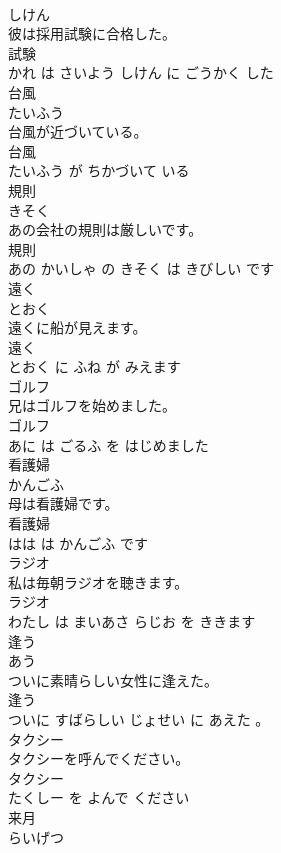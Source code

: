 \documentclass[8pt]{extreport}
\begin{document}
\begin{CJK}{UTF8}{min}
\\	しけん			
\\	彼は採用試験に合格した。	
\\	試験 
\\	かれ は さいよう しけん に ごうかく した			
\\	台風	
\\	たいふう			
\\	台風が近づいている。	
\\	台風 
\\	たいふう が ちかづいて いる			
\\	規則	
\\	きそく			
\\	あの会社の規則は厳しいです。	
\\	規則 
\\	あの かいしゃ の きそく は きびしい です			
\\	遠く	
\\	とおく			
\\	遠くに船が見えます。	
\\	遠く 
\\	とおく に ふね が みえます			
\\	ゴルフ	
\\	兄はゴルフを始めました。	
\\	ゴルフ 
\\	あに は ごるふ を はじめました			
\\	看護婦	
\\	かんごふ			
\\	母は看護婦です。	
\\	看護婦 
\\	はは は かんごふ です			
\\	ラジオ	
\\	私は毎朝ラジオを聴きます。	
\\	ラジオ 
\\	わたし は まいあさ らじお を ききます			
\\	逢う	
\\	あう			
\\	ついに素晴らしい女性に逢えた。	
\\	逢う 
\\	ついに すばらしい じょせい に あえた 。			
\\	タクシー	
\\	タクシーを呼んでください。	
\\	タクシー 
\\	たくしー を よんで ください			
\\	来月	
\\	らいげつ			

\end{CJK}
\end{document}
